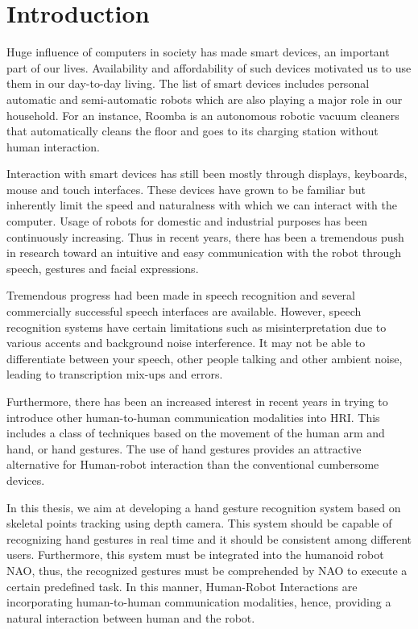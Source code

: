 \chapter{Introduction}
Huge influence of computers in society has made smart devices, an important part of our lives. Availability and affordability of such devices motivated us to use them in our day-to-day living. The list of smart devices includes personal automatic and semi-automatic robots which are also playing a major role in our household. For an instance, Roomba \cite{8} is an autonomous robotic vacuum cleaners that automatically cleans the floor and goes to its charging station without human interaction.

Interaction with smart devices has still been mostly through displays, keyboards, mouse and touch interfaces. These devices have grown to be familiar but inherently limit the speed and naturalness with which we can interact with the computer.  Usage of robots for domestic and industrial purposes has been continuously increasing. Thus in recent years, there has been a tremendous push in research toward an intuitive and easy communication with the robot through speech, gestures and facial expressions.

Tremendous progress had been made in speech recognition and several commercially successful speech interfaces are available. However, speech recognition systems have certain limitations such as misinterpretation due to various accents and background noise interference. It may not be able to differentiate between your speech, other people talking and other ambient noise, leading to transcription mix-ups and errors.

Furthermore, there has been an increased interest in recent years in trying to introduce other human-to-human communication modalities into HRI. This includes a class of techniques based on the movement of the human arm and hand, or hand gestures. The use of hand gestures provides an attractive alternative for Human-robot interaction than the conventional cumbersome devices.

In this thesis, we aim at developing a hand gesture recognition system based on skeletal points tracking using depth camera. This system should be capable of recognizing hand gestures in real time and it should be consistent among different users. Furthermore, this system must be integrated into the humanoid robot NAO, thus, the recognized gestures must be comprehended by NAO to execute a certain predefined task. In this manner, Human-Robot Interactions are incorporating human-to-human communication modalities, hence, providing a natural interaction between human and the robot.

